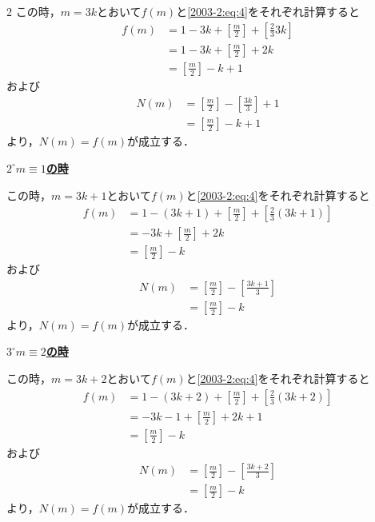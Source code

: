 \documentclass[../../main.tex]{subfiles}
\begin{document}
\begin{multicols}{2}
  この時，$m=3k$とおいて$f(m)$と\cref{2003-2:eq:4}をそれぞれ計算すると
  \begin{align*}
    f(m)
     & = 1-3k+\left[\frac{m}{2}\right]+\left[\frac{2}{3}3k\right] \\
     & = 1-3k+\left[\frac{m}{2}\right] + 2k                       \\
     & = \left[\frac{m}{2}\right] - k +1
  \end{align*}
  および
  \begin{align*}
    N(m)
     & = \left[\frac{m}{2}\right] - \left[\frac{3k}{3}\right] + 1 \\
     & = \left[\frac{m}{2}\right] - k + 1
  \end{align*}
  より，$N(m)=f(m)$が成立する．

  \vspace{5pt}
  \underline{\textbf{$2^{\circ} m \equiv 1$の時}}

  この時，$m=3k+1$とおいて$f(m)$と\cref{2003-2:eq:4}をそれぞれ計算すると
  \begin{align*}
    f(m)
     & = 1-(3k+1)+\left[\frac{m}{2}\right]+\left[\frac{2}{3}(3k+1)\right] \\
     & = -3k+\left[\frac{m}{2}\right] + 2k                                \\
     & = \left[\frac{m}{2}\right] - k
  \end{align*}
  および
  \begin{align*}
    N(m)
     & = \left[\frac{m}{2}\right] - \left[\frac{3k+1}{3}\right] \\
     & = \left[\frac{m}{2}\right] - k
  \end{align*}
  より，$N(m)=f(m)$が成立する．

  \vspace{5pt}
  \underline{\textbf{$3^{\circ} m \equiv 2$の時}}

  この時，$m=3k+2$とおいて$f(m)$と\cref{2003-2:eq:4}をそれぞれ計算すると
  \begin{align*}
    f(m)
     & = 1-(3k+2)+\left[\frac{m}{2}\right]+\left[\frac{2}{3}(3k+2)\right] \\
     & = -3k-1+\left[\frac{m}{2}\right] + 2k+1                            \\
     & = \left[\frac{m}{2}\right] - k
  \end{align*}
  および
  \begin{align*}
    N(m)
     & = \left[\frac{m}{2}\right] - \left[\frac{3k+2}{3}\right] \\
     & = \left[\frac{m}{2}\right] - k
  \end{align*}
  より，$N(m)=f(m)$が成立する．


\end{multicols}
\end{document}
